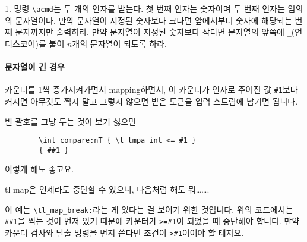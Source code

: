 \documentclass[a4paper,amsmath]{oblivoir}
\begin{document}
\clearpage

\begin{questionp}
 1. 명령 \verb|\acmd|는 두 개의 인자를 받는다. 첫 번째 인자는 숫자이며 두 번째 인자는 임의의 문자열이다. 만약 문자열이 지정된 숫자보다 크다면 앞에서부터 숫자에 해당되는 번째 문자까지만 출력하라. 만약 문자열이 지정된 숫자보다 작다면 문자열의 앞쪽에 \verb|_|(언더스코어)를 붙여 $n$개의 문자열이 되도록 하라.
\end{questionp}

\paragraph{문자열이 긴 경우}

카운터를 1씩 증가시켜가면서 mapping하면서, 이 카운터가 인자로 주어진 값 \verb|#1|보다 커지면 아무것도 찍지 말고 그렇지 않으면 받은 토큰을 입력 스트림에 남기면 됩니다.


빈 괄호를 그냥 두는 것이 보기 싫으면
\begin{verbatim}
        \int_compare:nT { \l_tmpa_int <= #1 }
        { ##1 }
\end{verbatim}
이렇게 해도 좋고요.

tl map은 언제라도 중단할 수 있으니, 다음처럼 해도 뭐\ldots\ldots.

이 예는 \verb|\tl_map_break:|라는 게 있다는 걸 보이기 위한 것입니다. 위의 코드에서는 \verb|##1|을 찍는 것이 먼저 있기 때문에 카운터가 \verb|>=#1|이 되었을 때 중단해야 합니다. 만약 카운터 검사와 탈출 명령을 먼저 쓴다면 조건이 \verb|>#1|이어야 할 테지요.
\end{document}

